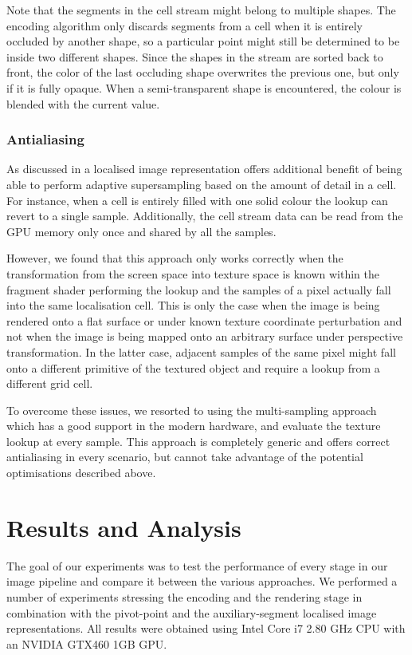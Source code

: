 \documentclass[11pt,a4paper,twoside]{article}
\begin{document}
Note that the segments in the cell stream might belong to multiple shapes. The encoding algorithm only discards segments from a cell when it is entirely occluded by another shape, so a particular point might still be determined to be inside two different shapes. Since the shapes in the stream are sorted back to front, the color of the last occluding shape overwrites the previous one, but only if it is fully opaque. When a semi-transparent shape is encountered, the colour is blended with the current value.

\subsubsection {Antialiasing}

As discussed in \cite{NehabHoppe08} a localised image representation offers additional benefit of being able to perform adaptive supersampling based on the amount of detail in a cell. For instance, when a cell is entirely filled with one solid colour the lookup can revert to a single sample. Additionally, the cell stream data can be read from the GPU memory only once and shared by all the samples.

However, we found that this approach only works correctly when the transformation from the screen space into texture space is known within the fragment shader performing the lookup and the samples of a pixel actually fall into the same localisation cell. This is only the case when the image is being rendered onto a flat surface or under known texture coordinate perturbation and not when the image is being mapped onto an arbitrary surface under perspective transformation. In the latter case, adjacent samples of the same pixel might fall onto a different primitive of the textured object and require a lookup from a different grid cell.

To overcome these issues, we resorted to using the multi-sampling approach which has a good support in the modern hardware, and evaluate the texture lookup at every sample. This approach is completely generic and offers correct antialiasing in every scenario, but cannot take advantage of the potential optimisations described above.

\section {Results and Analysis}

The goal of our experiments was to test the performance of every stage in our image pipeline and compare it between the various approaches. We performed a number of experiments stressing the encoding and the rendering stage in combination with the pivot-point and the auxiliary-segment localised image representations. All results were obtained using Intel Core i7 2.80 GHz CPU with an NVIDIA GTX460 1GB GPU.
\end{document}
